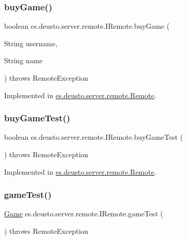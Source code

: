\subsubsection{\texorpdfstring{buy\+Game()}{buyGame()}}
{\footnotesize\ttfamily boolean es.\+deusto.\+server.\+remote.\+I\+Remote.\+buy\+Game (\begin{DoxyParamCaption}\item[{String}]{username,  }\item[{String}]{name }\end{DoxyParamCaption}) throws Remote\+Exception}



Implemented in \hyperlink{classes_1_1deusto_1_1server_1_1remote_1_1_remote_ad9f8ad426b1162504b7b39eb1c86d2a3}{es.\+deusto.\+server.\+remote.\+Remote}.

\mbox{\label{interfacees_1_1deusto_1_1server_1_1remote_1_1_i_remote_af921e33b96b8dac2b1b62a5e16c2952b}} 
\subsubsection{\texorpdfstring{buy\+Game\+Test()}{buyGameTest()}}
{\footnotesize\ttfamily boolean es.\+deusto.\+server.\+remote.\+I\+Remote.\+buy\+Game\+Test (\begin{DoxyParamCaption}{ }\end{DoxyParamCaption}) throws Remote\+Exception}



Implemented in \hyperlink{classes_1_1deusto_1_1server_1_1remote_1_1_remote_abf7e74962d613440fcac6c2c55110163}{es.\+deusto.\+server.\+remote.\+Remote}.

\mbox{\label{interfacees_1_1deusto_1_1server_1_1remote_1_1_i_remote_a253273caee8c2bceaa3b03922b2e3108}} 
\subsubsection{\texorpdfstring{game\+Test()}{gameTest()}}
{\footnotesize\ttfamily \hyperlink{classes_1_1deusto_1_1server_1_1db_1_1data_1_1_game}{Game} es.\+deusto.\+server.\+remote.\+I\+Remote.\+game\+Test (\begin{DoxyParamCaption}{ }\end{DoxyParamCaption}) throws Remote\+Exception}



